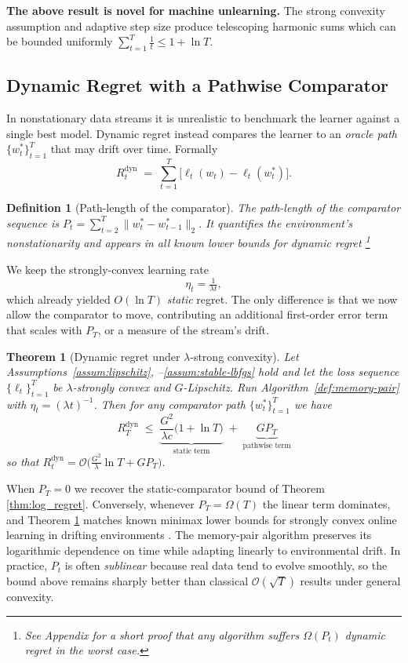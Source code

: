 \documentclass{article}
\theoremstyle{ssltheorem}
\newtheorem{theorem}{Theorem}
\newtheorem{definition}{Definition}
\begin{document}
\textbf{The above result is novel for machine unlearning.} The strong convexity assumption and adaptive step size produce telescoping harmonic sums which can be bounded uniformly $\sum^{T}_{t=1}\frac{1}{t} \leq 1 + \ln{T}$.
\subsection{Dynamic Regret with a Pathwise Comparator}
\label{subsec:dynamic_regret}

In nonstationary data streams it is unrealistic to benchmark the learner
against a single best model.
Dynamic regret instead compares the learner to an \emph{oracle path}
$\{w_{t}^{*}\}_{t=1}^{T}$ that may drift over time.
Formally
$$
  R_{t}^{\mathrm{dyn}}
  \;=\;
\sum_{t=1}^{T}\bigl[\ell_{t}(w_{t})-\ell_{t}(w_{t}^{*})\bigr].
$$

\begin{definition}[Path-length of the comparator]
\label{def:path_length}
The \emph{path-length} of the comparator sequence is
$
  P_{t}
  =\sum_{t=2}^{T}\lVert w_{t}^{*}-w_{t-1}^{*}\rVert_{2}.
$
It quantifies the environment’s nonstationarity
and appears in all known lower bounds for dynamic regret
\footnote{See Appendix for a short proof that any algorithm suffers
$\Omega(P_{t})$ dynamic regret in the worst case.}
\end{definition}

We keep the strongly-convex learning rate
$$
  \eta_{t} = \tfrac{1}{\lambda t},
$$
which already yielded \(O(\ln T)\) \emph{static} regret.
The only difference is that we now allow the comparator to move,
contributing an additional first-order error term that scales with $P_{T}$, or a measure of the stream's drift.
\begin{theorem}[Dynamic regret under $\lambda$-strong convexity]
\label{thm:dyn_regret}
Let Assumptions~\ref{assum:lipschitz}, –\ref{assum:stable-lbfgs} hold
and let the loss sequence
$\{\ell_{t}\}_{t=1}^{T}$ be $\lambda$-strongly convex and $G$-Lipschitz.
Run Algorithm~\ref{def:memory-pair} with
$\eta_{t} = (\lambda t)^{-1}$.
Then for \emph{any} comparator path $\{w_{t}^{*}\}_{t=1}^{T}$ we have
$$
  R_{T}^{\mathrm{dyn}}
  \;\le\;
\underbrace{\frac{G^{2}}{\lambda c}\bigl(1+\ln T\bigr)}_{\text{static term}}
  \;+\;
  \underbrace{G P_{T}}_{\text{pathwise term}}
$$
so that
$
  R_{t}^{\mathrm{dyn}}
  =
  \mathcal{O}\!\bigl(\tfrac{G^{2}}{\lambda}\ln T + G P_{T}\bigr).
$
\end{theorem}

When $P_{T}=0$ we recover the static-comparator bound of
Theorem \ref{thm:log_regret}.  Conversely, whenever $P_{T}=\Omega(T)$ the linear term dominates, and Theorem \ref{thm:dyn_regret} matches known minimax lower bounds for
strongly convex online learning in drifting environments \cite{vanwaerebeke2025when}.
The memory-pair algorithm preserves its logarithmic dependence on time while adapting linearly to environmental drift.
In practice, $P_{t}$ is often \emph{sublinear} because real data tend to evolve smoothly, so the bound above remains sharply better than classical $\mathcal{O}(\sqrt{T})$ results under general convexity.
\end{document}
